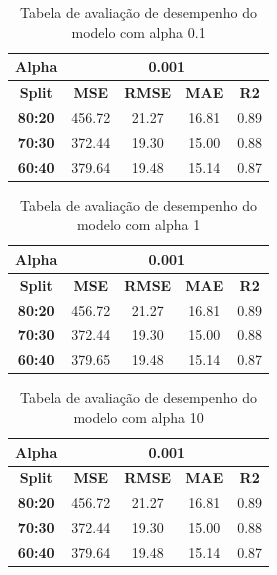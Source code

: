 \begin{table}[H]
\centering
\begin{tabular}{|c|c|c|c|c|}
\hline
\textbf{Alpha} & \multicolumn{4}{|c|}{\textbf{0.001}} \\
\hline
\textbf{Split} & \textbf{MSE} & \textbf{RMSE} & \textbf{MAE} & \textbf{R2} \\
\hline
\textbf{80:20} & 456.72 & 21.27 & 16.81 & 0.89 \\
\textbf{70:30} & 372.44 & 19.30 & 15.00 & 0.88 \\
\textbf{60:40} & 379.64 & 19.48 & 15.14 & 0.87 \\
\hline
\end{tabular}
\caption{Tabela de avaliação de desempenho do modelo com alpha 0.1}
\end{table}

\begin{table}[H]
\centering
\begin{tabular}{|c|c|c|c|c|}
\hline
\textbf{Alpha} & \multicolumn{4}{|c|}{\textbf{0.001}} \\
\hline
\textbf{Split} & \textbf{MSE} & \textbf{RMSE} & \textbf{MAE} & \textbf{R2} \\
\hline
\textbf{80:20} & 456.72 & 21.27 & 16.81 & 0.89 \\
\textbf{70:30} & 372.44 & 19.30 & 15.00 & 0.88 \\
\textbf{60:40} & 379.65 & 19.48 & 15.14 & 0.87 \\
\hline
\end{tabular}
\caption{Tabela de avaliação de desempenho do modelo com alpha 1}
\end{table}

\begin{table}[H]
\centering
\begin{tabular}{|c|c|c|c|c|}
\hline
\textbf{Alpha} & \multicolumn{4}{|c|}{\textbf{0.001}} \\
\hline
\textbf{Split} & \textbf{MSE} & \textbf{RMSE} & \textbf{MAE} & \textbf{R2} \\
\hline
\textbf{80:20} & 456.72 & 21.27 & 16.81 & 0.89 \\
\textbf{70:30} & 372.44 & 19.30 & 15.00 & 0.88 \\
\textbf{60:40} & 379.64 & 19.48 & 15.14 & 0.87 \\
\hline
\end{tabular}
\caption{Tabela de avaliação de desempenho do modelo com alpha 10}
\end{table}

